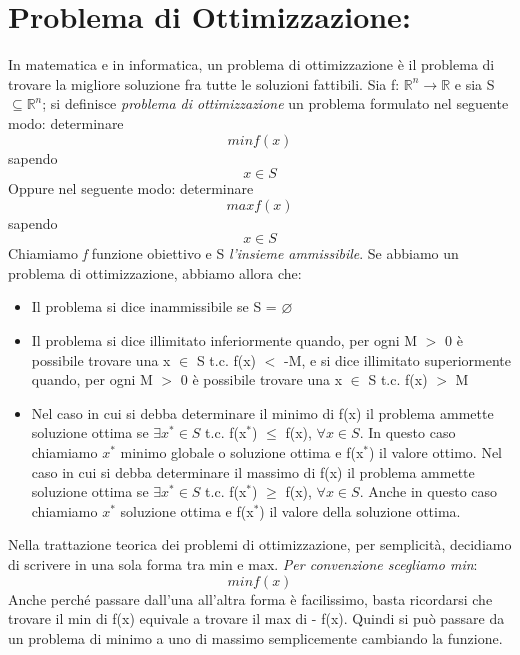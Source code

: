 
\section{Problema di Ottimizzazione:} In matematica e in informatica, un problema di ottimizzazione è il problema di trovare la migliore soluzione fra tutte le soluzioni fattibili. Sia f: $\mathbb{R}^n \to \mathbb{R}$ e sia S $\subseteq \mathbb{R}^n$; si definisce \textit{problema di ottimizzazione} un problema formulato nel seguente modo: determinare
\begin{equation*}
    min f(x)
\end{equation*}
sapendo
\begin{equation*}
    x \in S 
\end{equation*}
Oppure nel seguente modo: determinare 
\begin{equation*}
    max f(x)
\end{equation*}
sapendo
\begin{equation*}
    x \in S 
\end{equation*}
Chiamiamo \textit{f} funzione obiettivo e S \textit{l'insieme ammissibile}. Se abbiamo un problema di ottimizzazione, abbiamo allora che:
\begin{itemize}
    \item Il problema si dice inammissibile se S = $\varnothing$
    \item Il problema si dice illimitato inferiormente quando, per ogni M $>$ 0 è possibile trovare una x $\in$ S t.c. f(x) $<$ -M, e si dice illimitato superiormente quando, per ogni M $>$ 0 è possibile trovare una x $\in$ S t.c. f(x) $>$ M
    \item Nel caso in cui si debba determinare il minimo di f(x) il problema ammette soluzione ottima se $\exists x^* \in S$ t.c. f(x$^*$) $\leq$ f(x), $\forall x \in S$. In questo caso chiamiamo $x^*$ minimo globale o soluzione ottima e f(x$^*$) il valore ottimo. Nel caso in cui si debba determinare il massimo di f(x) il problema ammette soluzione ottima se $\exists x^* \in S$ t.c. f(x$^*$) $\geq$ f(x), $\forall x \in S$. Anche in questo caso chiamiamo $x^*$ soluzione ottima e f(x$^*$) il valore della soluzione ottima.
\end{itemize}
Nella trattazione teorica dei problemi di ottimizzazione, per semplicità, decidiamo di scrivere in una sola forma tra min e max. \textit{Per convenzione scegliamo min}:
\begin{equation*}
    min f(x)
\end{equation*}
Anche perché passare dall'una all'altra forma è facilissimo, basta ricordarsi che trovare il min di f(x) equivale a trovare il max di - f(x). Quindi si può passare da un problema di minimo a uno di massimo semplicemente cambiando la funzione.




